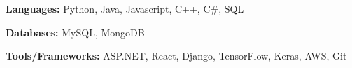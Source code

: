\begin{siderulesSos}
\begin{skillSection}
\cvskillentry
    {
      \begin{cvsositems}
        \item {\color{black}\textbf{Languages:} Python, Java, Javascript, C++, C#, SQL}
        \item {\color{black}\textbf{Databases:} MySQL, MongoDB}
        \item {\color{black}\textbf{Tools/Frameworks:} ASP.NET, React, Django, TensorFlow, Keras, AWS, Git}
      \end{cvsositems}
    }
\end{skillSection}
\end{siderulesSos}